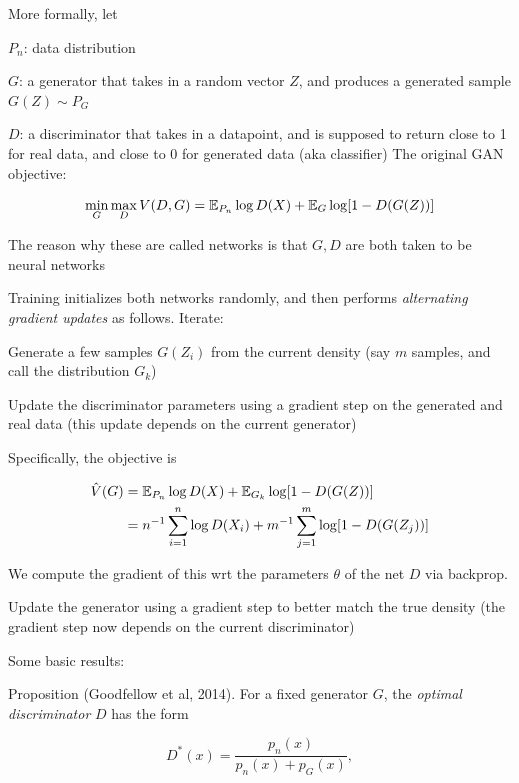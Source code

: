 \documentclass[english]{article}
\begin{document}
 \item 
More formally, let 

\bitem
 \item 

$P_n$: data distribution
 \item 

$G$: a generator that takes in a random vector $Z$, and produces a generated sample $G(Z) \sim P_G$
 \item 

$D$: a discriminator that takes in a datapoint, and is supposed to return close to 1 for real data, and close to 0 for generated data (aka classifier)
\eitem 
The original GAN objective: 

$$\min_G\max_D V(D,G) = \mathbb{E}_{P_n} \log D(X) + \mathbb{E}_{G} \log[1-D(G(Z))] $$
 
The reason why these are called networks is that $G,D$ are both taken to be neural networks

\item Training initializes both networks randomly, and then performs \emph{alternating gradient updates} as follows.  Iterate:
\benum
\item Generate a few samples $G(Z_i)$ from the current density (say $m$ samples, and call the distribution $G_k$)
\item Update the discriminator parameters  using a gradient step on the generated and real data (this update depends on the current generator)

Specifically, the objective is

\begin{align*}
\hat V(G) & = \mathbb{E}_{P_n} \log D(X) + \mathbb{E}_{G_k} \log[1-D(G(Z))]\\
&= n^{-1}\sum_{i=1}^n\log D(X_i) + m^{-1}\sum_{j=1}^m \log[1-D(G(Z_j))]
\end{align*}

We compute the gradient of this wrt the parameters $\theta$ of the net $D$ via backprop. 


\item Update the generator using a gradient step to better match the true density (the gradient step now depends on the current discriminator)
\eenum

\item Some basic results: 

Proposition (Goodfellow et al, 2014). For a fixed generator $G$, the \emph{optimal discriminator} $D$ has the form 

$$D^*(x) = \frac{p_n(x)}{p_n(x)+p_G(x)},$$
\end{document}
